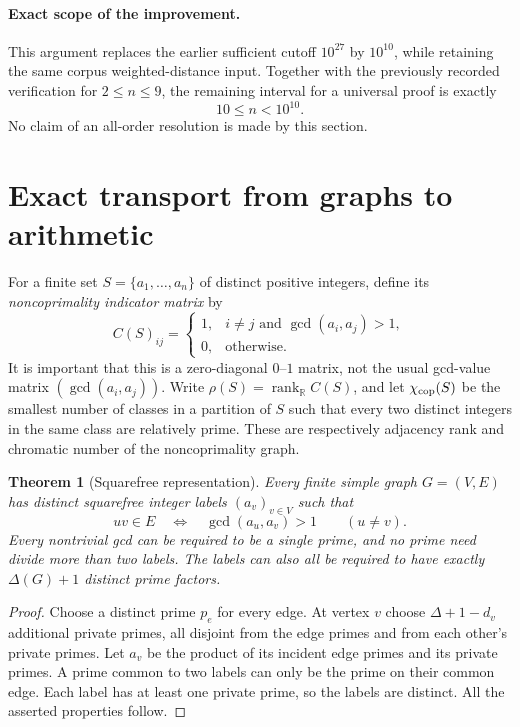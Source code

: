 \documentclass[11pt,a4paper]{article}
\newtheorem{theorem}{Theorem}[section]
\theoremstyle{definition}
\theoremstyle{remark}
\DeclareMathOperator{\rank}{rank}
\newcommand{\R}{\mathbb R}
\newcommand{\cchi}{\chi_{\rm cop}}
\numberwithin{equation}{section}
\begin{document}
\paragraph{Exact scope of the improvement.}
This argument replaces the earlier sufficient cutoff $10^{27}$ by
$10^{10}$, while retaining the same corpus weighted-distance input.
Together with the previously recorded verification for $2\le n\le9$, the
remaining interval for a universal proof is exactly
\[
                    10\le n<10^{10}.
\]
No claim of an all-order resolution is made by this section.

\section{Exact transport from graphs to arithmetic}

For a finite set $S=\{a_1,\ldots,a_n\}$ of distinct positive integers,
define its \emph{noncoprimality indicator matrix} by
\[
C(S)_{ij}=
\begin{cases}
1,&i\ne j\text{ and }\gcd(a_i,a_j)>1,\\
0,&\text{otherwise}.
\end{cases}
\]
It is important that this is a zero-diagonal $0$--$1$ matrix,
not the usual gcd-value matrix $(\gcd(a_i,a_j))$.
Write $\rho(S)=\rank_{\R}C(S)$, and let $\cchi(S)$ be the smallest
number of classes in a partition of $S$ such that every two distinct
integers in the same class are relatively prime.
These are respectively adjacency rank and chromatic number of the
noncoprimality graph.

\begin{theorem}[Squarefree representation]\label{thm:representation}
Every finite simple graph $G=(V,E)$ has distinct squarefree integer
labels $(a_v)_{v\in V}$ such that
\[
uv\in E\quad\Longleftrightarrow\quad \gcd(a_u,a_v)>1
\qquad(u\ne v).
\]
Every nontrivial gcd can be required to be a single prime, and
no prime need divide more than two labels. The labels can also all
be required to have exactly $\Delta(G)+1$ distinct prime factors.
\end{theorem}
\begin{proof}
Choose a distinct prime $p_e$ for every edge. At vertex $v$ choose
$\Delta+1-d_v$ additional private primes, all disjoint from the edge
primes and from each other's private primes. Let $a_v$ be the product
of its incident edge primes and its private primes. A prime common to
two labels can only be the prime on their common edge. Each label has
at least one private prime, so the labels are distinct. All the asserted
properties follow.
\end{proof}
\end{document}
